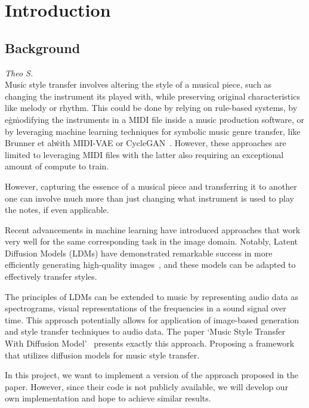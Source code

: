 \section{Introduction}

\subsection{Background}
\textit{Theo S.}\\
Music style transfer involves altering the style of a musical piece, 
such as changing the instrument its played with, 
while preserving original characteristics like melody or rhythm.
This could be done by relying on rule-based systems, 
by e\.g\. modifying the instruments in a MIDI file inside a music production software, 
or by leveraging machine learning techniques for symbolic music genre transfer, like Brunner et al\. with MIDI-VAE or CycleGAN~\cite{Brunner2018MIDIVAEMD, Brunner2018SymbolicMG}.
However, these approaches are limited to leveraging MIDI files with the latter also requiring an exceptional amount of compute to train.


However, capturing the essence of a musical piece and transferring it to another one can involve much more than just 
changing what instrument is used to play the notes, if even applicable.

Recent advancements in machine learning have introduced approaches that work very well for the same corresponding task in 
the image domain. Notably, Latent Diffusion Models (LDMs) have demonstrated remarkable success 
in more efficiently generating high-quality images~\cite{rombach2022high}, and these models can be adapted to effectively transfer styles.

The principles of LDMs can be extended to music by representing audio data as spectrograms, 
visual representations of the frequencies in a sound signal over time.
This approach potentially allows for application of image-based generation and style transfer techniques to audio data.
The paper `Music Style Transfer With Diffusion Model'~\cite{huang2024music} presents exactly this approach. 
Proposing a framework that utilizes diffusion models for music style transfer.

In this project, we want to implement a version of the approach proposed in the paper.
However, since their code is not publicly available, we will develop our own implementation and hope to achieve similar results.

